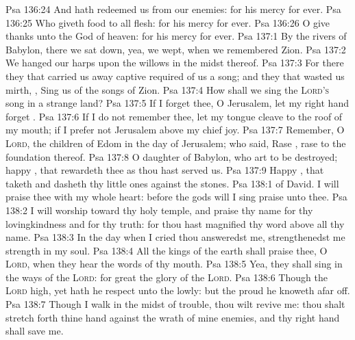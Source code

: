\vs Psa 136:24 And hath redeemed us from our enemies: for his mercy  for ever.
\vs Psa 136:25 Who giveth food to all flesh: for his mercy  for ever.
\vs Psa 136:26 O give thanks unto the God of heaven: for his mercy  for ever.
\vs Psa 137:1 By the rivers of Babylon, there we sat down, yea, we wept, when we remembered Zion.
\vs Psa 137:2 We hanged our harps upon the willows in the midst thereof.
\vs Psa 137:3 For there they that carried us away captive required of us a song; and they that wasted us  mirth, , Sing us  of the songs of Zion.
\vs Psa 137:4 How shall we sing the \textsc{Lord's} song in a strange land?
\vs Psa 137:5 If I forget thee, O Jerusalem, let my right hand forget .
\vs Psa 137:6 If I do not remember thee, let my tongue cleave to the roof of my mouth; if I prefer not Jerusalem above my chief joy.
\vs Psa 137:7 Remember, O \textsc{Lord}, the children of Edom in the day of Jerusalem; who said, Rase , rase  to the foundation thereof.
\vs Psa 137:8 O daughter of Babylon, who art to be destroyed; happy , that rewardeth thee as thou hast served us.
\vs Psa 137:9 Happy , that taketh and dasheth thy little ones against the stones.
\vs Psa 138:1  of David. I will praise thee with my whole heart: before the gods will I sing praise unto thee.
\vs Psa 138:2 I will worship toward thy holy temple, and praise thy name for thy lovingkindness and for thy truth: for thou hast magnified thy word above all thy name.
\vs Psa 138:3 In the day when I cried thou answeredst me,  strengthenedst me  strength in my soul.
\vs Psa 138:4 All the kings of the earth shall praise thee, O \textsc{Lord}, when they hear the words of thy mouth.
\vs Psa 138:5 Yea, they shall sing in the ways of the \textsc{Lord}: for great  the glory of the \textsc{Lord}.
\vs Psa 138:6 Though the \textsc{Lord}  high, yet hath he respect unto the lowly: but the proud he knoweth afar off.
\vs Psa 138:7 Though I walk in the midst of trouble, thou wilt revive me: thou shalt stretch forth thine hand against the wrath of mine enemies, and thy right hand shall save me.
